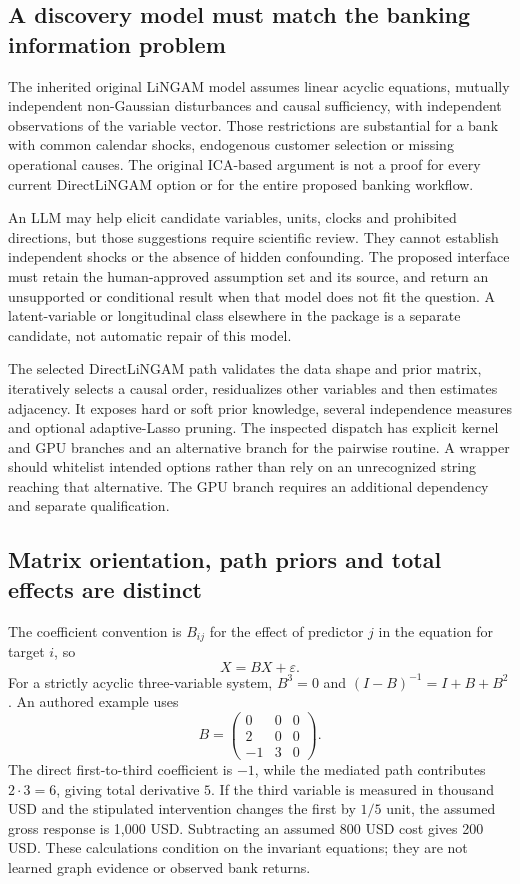 \subsection{A discovery model must match the banking information problem}
The inherited original LiNGAM model assumes linear acyclic equations,
mutually independent non-Gaussian disturbances and causal sufficiency,
with independent observations of the variable vector. Those restrictions
are substantial for a bank with common calendar shocks, endogenous
customer selection or missing operational causes. The original ICA-based
argument is not a proof for every current DirectLiNGAM option or for the
entire proposed banking workflow.~\citep{exec13_pydisc_shimizu2006}

An LLM may help elicit candidate variables, units, clocks and prohibited
directions, but those suggestions require scientific review. They cannot
establish independent shocks or the absence of hidden confounding. The
proposed interface must retain the human-approved assumption set and its
source, and return an unsupported or conditional result when that model
does not fit the question. A latent-variable or longitudinal class elsewhere
in the package is a separate candidate, not automatic repair of this model.
\citep{exec24_lingam_choice}

The selected DirectLiNGAM path validates the data shape and prior matrix,
iteratively selects a causal order, residualizes other variables and then
estimates adjacency. It exposes hard or soft prior knowledge, several
independence measures and optional adaptive-Lasso pruning. The inspected
dispatch has explicit kernel and GPU branches and an alternative branch
for the pairwise routine. A wrapper should whitelist intended options
rather than rely on an unrecognized string reaching that alternative.
The GPU branch requires an additional dependency and separate qualification.
\citep{exec24_lingam_source}

\subsection{Matrix orientation, path priors and total effects are distinct}
The coefficient convention is $B_{ij}$ for the effect of predictor $j$
in the equation for target $i$, so
\[
 X=BX+\varepsilon.
\]
For a strictly acyclic three-variable system, $B^3=0$ and
$(I-B)^{-1}=I+B+B^2$. An authored example uses
\[
 B=\begin{pmatrix}0&0&0\\2&0&0\\-1&3&0\end{pmatrix}.
\]
The direct first-to-third coefficient is $-1$, while the mediated path
contributes $2\cdot3=6$, giving total derivative $5$. If the third variable
is measured in thousand USD and the stipulated intervention changes the
first by $1/5$ unit, the assumed gross response is 1,000 USD. Subtracting
an assumed 800 USD cost gives 200 USD. These calculations condition on
the invariant equations; they are not learned graph evidence or observed
bank returns.~\citep{exec24_lingam_choice}

